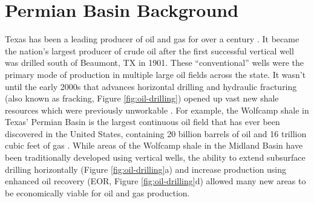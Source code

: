 
\chapter{Permian Basin Background}
\label{CHAP:2}





Texas has been a leading producer of oil and gas for over a century \citep{Frohlich2016HistoricalReviewInduced, TheAcademyofMedicine2017EnvironmentalCommunityImpacts}. It became the nation's largest producer of crude oil after the first successful vertical well was drilled south of Beaumont, TX in 1901. These ``conventional'' wells were the primary mode of production in multiple large oil fields across the state. It wasn't until the early 2000s that advances horizontal drilling and hydraulic fracturing (also known as fracking, Figure \ref{fig:oil-drilling}) opened up vast new shale resources which were previously unworkable \citep{Waters2006Spe103202Ms}. 
For example, the Wolfcamp shale in Texas' Permian Basin is the largest continuous oil field that has ever been discovered in the United States, containing 20 billion barrels of oil and 16 trillion cubic feet of gas \citep{Gaswirth2016AssessmentUndiscoveredContinuous}. While areas of the Wolfcamp shale in the Midland Basin have been traditionally developed using vertical wells, the ability to extend subsurface drilling horizontally (Figure \ref{fig:oil-drilling}a) and increase production using enhanced oil recovery (EOR, Figure \ref{fig:oil-drilling}d)
allowed many new areas to be economically viable for oil and gas production.



